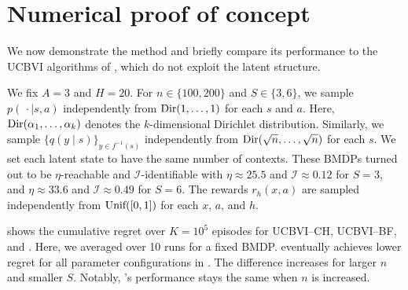 \documentclass[11pt]{article}
\newcommand{\mcI}{\mathcal{I}}
\theoremstyle{definition}
\theoremstyle{definition}
\begin{document}
\section{Numerical proof of concept}
\label{sec:numerical}

We now demonstrate the method and briefly compare its performance to the UCBVI algorithms of \cite{UCRLVI}, which do not exploit the latent structure.

We fix $A=3$ and $H=20$.
For $n\in\{100,200\}$ and $S\in\{3,6\}$, we sample $p(\,\cdot\mid s,a)$ independently from $\textnormal{Dir}(1,\ldots,1)$ for each $s$ and $a$.
Here, $\textnormal{Dir}(\alpha_1,\ldots,\alpha_k)$ denotes the $k$-dimensional Dirichlet distribution.
Similarly, we sample $\{q(y\mid s)\}_{y\in f^{-1}(s)}$ independently from $\textnormal{Dir}(\sqrt{n},\ldots,\sqrt{n})$ for each $s$.
We set each latent state to have the same number of contexts.
These \glspl{BMDP} turned out to be $\eta$-reachable and $\mcI$-identifiable with $\eta \approx 25.5$ and $\mcI\approx 0.12$ for $S=3$, and $\eta \approx 33.6$ and $\mcI\approx 0.49$ for $S=6$.
The rewards $r_h(x,a)$ are sampled independently from $\textnormal{Unif}([0,1])$ for each $x$, $a$, and $h$.

 shows the cumulative regret over $K=10^5$ episodes for UCBVI--CH, UCBVI--BF, and .
Here, we averaged over 10 runs for a fixed \gls{BMDP}.
 eventually achieves lower regret for all parameter configurations in .
The difference increases for larger $n$ and smaller $S$.
Notably, 's performance stays the same when $n$ is increased.
\end{document}
